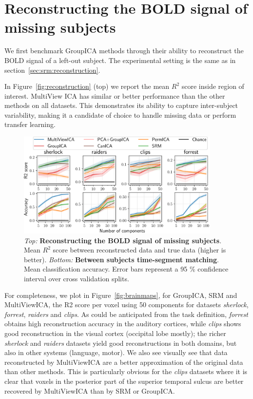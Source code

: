\section{Reconstructing the BOLD signal of missing subjects}
We first benchmark GroupICA methods through their ability to reconstruct the
BOLD signal of a left-out subject.
The experimental setting is the same as in section~\ref{sec:srm:reconstruction}.

 In Figure~\ref{fig:reconstruction}
(top) we report the mean $R^2$ score inside region of interest.
%
MultiView ICA has similar or better performance than the other methods on all datasets.
%
This demonstrates its ability to capture inter-subject variability, making it a candidate of choice to handle missing data or perform transfer learning.

\begin{figure}
  \centering
  \includegraphics[width=0.9\textwidth]{figures/mvica/timesegment_matching_reconstruction.pdf}
  \caption{\emph{Top:} \textbf{Reconstructing the BOLD signal of
      missing subjects}. Mean $R^2$ score between reconstructed data and true
    data (higher is better). \emph{Bottom:} \textbf{Between subjects time-segment matching}. Mean
    classification accuracy. Error bars represent a 95 \% confidence interval over cross validation splits.}
  \label{fig:reconstruction}
  \label{fig:timesegment}
\end{figure}


For completeness, we plot in Figure~\ref{fig:brainmaps}, for GroupICA, SRM and MultiViewICA, the R2 score per voxel using 50 components for datasets \emph{sherlock}, \emph{forrest}, \emph{raiders} and \emph{clips}. As could be anticipated from the task definition, \emph{forrest} obtains high reconstruction accuracy in the auditory cortices, while \emph{clips} shows good reconstruction in the visual cortex (occipital lobe mostly); the richer \emph{sherlock} and \emph{raiders} datasets yield good reconstructions in both domains, but also in other systems (language, motor).
%
We also see visually see that data reconstructed by MultiViewICA are
a better approximation of the original data than other methods.
%
This is particularly obvious for the \emph{clips} datasets where it is
clear that voxels in the posterior part of the superior
temporal sulcus are better recovered by MultiViewICA than by SRM or
GroupICA.

